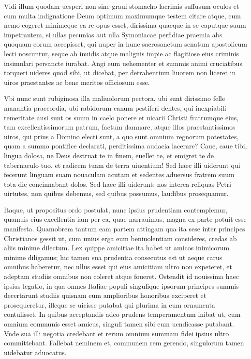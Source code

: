 \documentclass[a5paper,twoside]{article}
\begin{document}
Vidi illum quodam uesperi non sine graui stomacho lacrimis suffusum oculos et cum multa indignatione Deum optimum maximumque testem citare atque, cum nemo cogeret minimeque ea re opus esset, dirissima quaeque in se caputque suum impetrantem, si ullas pecunias aut ulla Symoniacae perfidiae praemia abs quoquam eorum accepisset, qui nuper in hunc sacrosanctum senatum apostolicum lecti noscuntur, seque ab inuidis atque malignis impie ac flagitiose eius criminis insimulari persancte iurabat. Angi eum uehementer et summis animi cruciatibus torqueri uideres quod sibi, ut dicebat, per detrahentium liuorem non liceret in uiros praestantes ac bene meritos officiosum esse.

Vbi nunc sunt rubiginosa illa maliuolorum pectora, ubi sunt dirissimo felle manantia praecordia, ubi rabidorum canum pestiferi dentes, qui inexpiabili temeritate ausi sunt os suum in caelo ponere et uicarii Christi fratrumque eius, tam excellentissimorum patrum, factum damnare, atque illos praestantissimos uiros, qui prius a Domino electi sunt, a quo sunt omnium regnorum potestates, quam a summo pontifice declarati, perditissima audacia lacerare?  Caue, caue tibi, lingua dolosa, ne Deus destruat te in finem, euellet te, et emigret te de tabernaculo tuo, et radicem tuam de terra uiuentium!  Sed haec illi uiderunt qui fecerunt linguam suam nouaculam acutam et sedentes aduersus fratrem suum tota die concinnabant dolos. Sed haec illi uiderunt; nos interea reliquas Petri uirtutes, non quibus debemus, sed quibus possumus, laudibus prosequamur.

Itaque, ut propositus ordo postulat, nunc ipsius prudentiam contemplemur, quamuis eius excellentia iam per ea, quae narrauimus, magna ex parte potuit esse manifesta. Quamobrem tantum eam partem attingam qua ita sese inter principes Christianos gessit ut, cum unius erga eum beniuolentiam consideres, credas ab aliis minime dilectum. Lex quippe amicitiae ita habet ut amicos inimicorum minime diligamus; hic tamen sua prudentia consecutus est ut aeque carus omnibus haberetur, nec ullus esset qui eius amicitiam ultro non expeteret, et adeptam studiis omnibus non coleret atque foueret. Ostendit id nouissima haec ipsius legatio, in qua omnes Italiae populi singulique ipsorum principes summis decertarunt studiis quisnam eum amplioribus honoribus exciperet et prosequeretur, illeque se uicisse putabat qui plurima in eum ornamenta contulisset. In quibus acceptandis adeo prudens temperamentum inibat ut, cum omnium communis esset amicus, singuli tamen sibi eum uendicasse putabant. Vnde sua illi negotia credebant et rerum omnium summam fidei ipsius ultro committebant. Fallebat neminem et, communem rem gerendo, singulorum tamen uidebatur aduocatus. 
\end{document}
